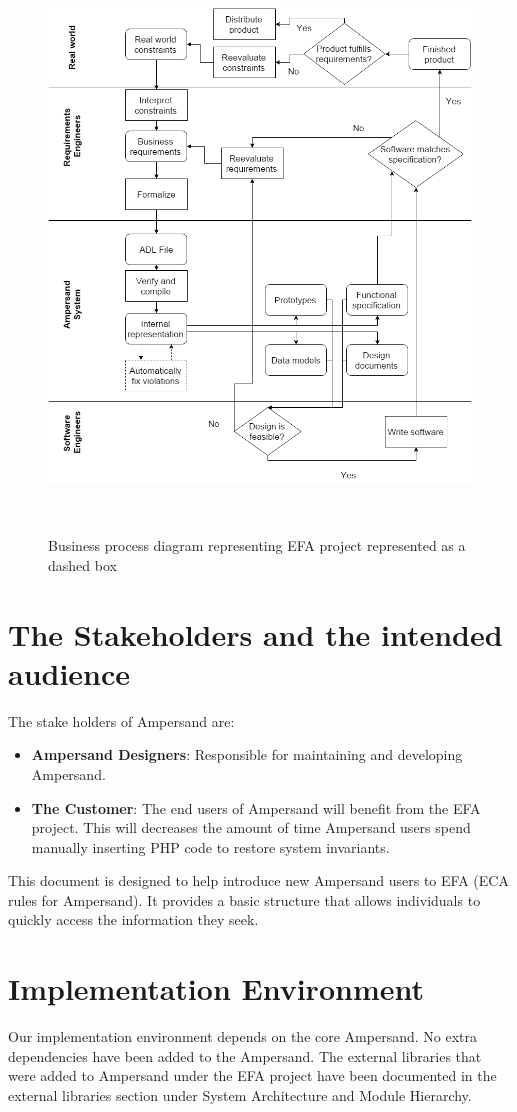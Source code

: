 \begin{figure}[!htb]
\begin{center}
\includegraphics[width=\textwidth]{../figures/business_process}
\caption{Business process diagram representing EFA project represented as a dashed box}~\label{fig:EFAproject}
\end{center}
\end{figure}

 \section{The Stakeholders and the intended audience}\label{sec:Stakeholders}
The stake holders of Ampersand are:

\begin{itemize}
	\item \textbf{Ampersand Designers}: Responsible for maintaining and developing Ampersand.
	\item \textbf{The Customer}: The end users of Ampersand will benefit from the EFA project. This will decreases the amount of time 
Ampersand users spend manually inserting PHP code to restore system invariants. 
\end{itemize}

This document is designed to help introduce new Ampersand users to EFA 
(ECA rules for Ampersand). It provides a basic structure that allows 
individuals to quickly access the information they seek. 
 

 \section{Implementation Environment}
Our implementation environment depends on the core Ampersand. No extra dependencies have been added to the Ampersand. The external libraries that were added to Ampersand under the EFA project have been documented in the external libraries section under System Architecture and Module Hierarchy.
%
